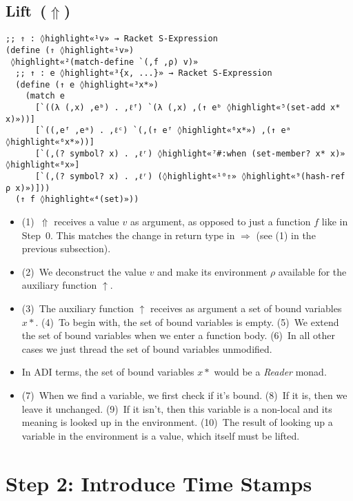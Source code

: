 \documentclass[12pt, oneside]{book}
\begin{document}
\subsection{Lift~(\(⇑\))}

\begin{Verbatim}
;; ⇑ : ◊highlight«¹v» → Racket S-Expression
(define (⇑ ◊highlight«¹v»)
 ◊highlight«²(match-define `(,f ,ρ) v)»
  ;; ↑ : e ◊highlight«³{x, ...}» → Racket S-Expression
  (define (↑ e ◊highlight«³x*»)
    (match e
      [`((λ (,x) ,eᵇ) . ,ℓᶠ) `(λ (,x) ,(↑ eᵇ ◊highlight«⁵(set-add x* x)»))]
      [`((,eᶠ ,eᵃ) . ,ℓᶜ) `(,(↑ eᶠ ◊highlight«⁶x*») ,(↑ eᵃ ◊highlight«⁶x*»))]
      [`(,(? symbol? x) . ,ℓʳ) ◊highlight«⁷#:when (set-member? x* x)» ◊highlight«⁸x»]
      [`(,(? symbol? x) . ,ℓʳ) (◊highlight«¹⁰⇑» ◊highlight«⁹(hash-ref ρ x)»)]))
  (↑ f ◊highlight«⁴(set)»))
\end{Verbatim}

\begin{itemize}
  \item (1)~\(⇑\) receives a value \(v\) as argument, as opposed to just a function \(f\) like in Step~0. This matches the change in return type in \(⇒\) (see (1) in the previous subsection).
  \item (2)~We deconstruct the value \(v\) and make its environment \(ρ\) available for the auxiliary function \(↑\).
  \item (3)~The auxiliary function \(↑\) receives as argument a set of bound variables \(x*\). (4)~To begin with, the set of bound variables is empty. (5)~We extend the set of bound variables when we enter a function body. (6)~In all other cases we just thread the set of bound variables unmodified.
  \item In ADI terms, the set of bound variables \(x*\) would be a \emph{Reader} monad.
  \item (7)~When we find a variable, we first check if it’s bound. (8)~If it is, then we leave it unchanged. (9)~If it isn’t, then this variable is a non-local and its meaning is looked up in the environment. (10)~The result of looking up a variable in the environment is a value, which itself must be lifted.
\end{itemize}

\section{Step 2: Introduce Time Stamps}
\label{section:step-2--introduce-time-stamps}
\end{document}
